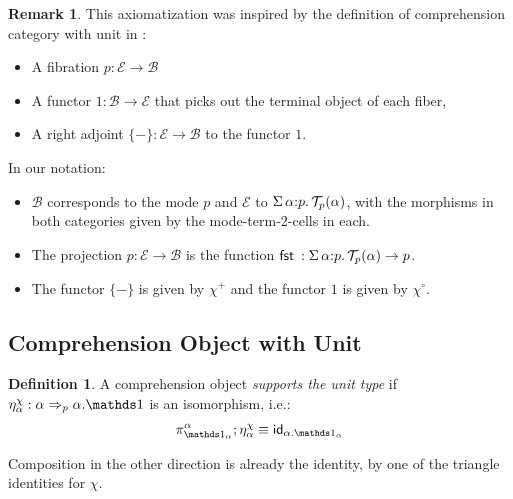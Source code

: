 \documentclass[10pt]{article}
\theoremstyle{definition}
\newtheorem{definition}{Definition}
\newtheorem{remark}{Remark}
\newcommand\dsd[1]{\ensuremath{\mathsf{#1}}}
\newcommand{\tcell}{\Rightarrow}
\newcommand{\app}[2]{\ensuremath{#1 \: #2}}
\newcommand{\sigmacl}[3]{\ensuremath{\textnormal{$\Sigma$}\,#1{:}#2.\,#3}}
\newcommand{\fst}[1]{\app{\dsd{fst}}{#1}}
\newcommand{\id}{\mathsf{id}}
\newcommand\El[2]{\mathcal{T}_{#1}(#2)}
\begin{document}
\begin{remark}
This axiomatization was inspired by the definition of comprehension
category with unit in \cite{ahman+16fibered}:
\begin{itemize}
\item A fibration $p : \mathcal{E} \to \mathcal{B}$
\item A functor $1 : \mathcal{B} \to \mathcal{E}$ that picks out the terminal object of each fiber,
\item A right adjoint $\{-\} : \mathcal{E} \to \mathcal{B}$ to the functor $1$.
\end{itemize}
In our notation:
\begin{itemize}
\item $\mathcal{B}$ corresponds to the mode $p$ and $\mathcal{E}$ to $\sigmacl{\alpha}{p}{\El{p}{\alpha}}$, with the morphisms in both categories given by the mode-term-2-cells in each.

\item The projection $p : \mathcal{E} \to \mathcal{B}$ is the function $\fst : \sigmacl{\alpha}{p}{\El{p}{\alpha}} \to p$. 

\item The functor $\{-\}$ is given by $\chi^+$ and the functor $1$ is given by $\chi^\circ$.
\end{itemize}
\end{remark}

\subsection{Comprehension Object with Unit}
\begin{definition}
A comprehension object \emph{supports the unit type} if $\eta^\chi_\alpha : \alpha \tcell_p \alpha.\One$ is an isomorphism, i.e.:
\begin{align}
\pi^\alpha_{\One_\alpha} ; \eta^\chi_\alpha \equiv \id_{\alpha.\One_\alpha}
\end{align}
\end{definition}
Composition in the other direction is already the identity, by one of the triangle identities for $\chi$.
\end{document}
